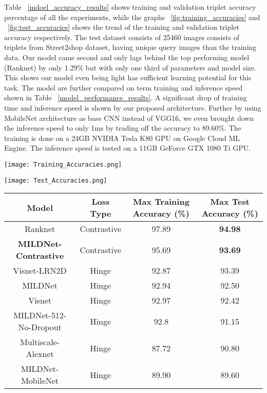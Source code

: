 \documentclass[10pt,twocolumn,letterpaper]{article}
\begin{document}
Table ~\ref{mdoel_accuracy_results} shows training and validation triplet accuracy percentage of all the experiments, while the graphs ~\ref{fig:training_accuracies} and ~\ref{fig:test_accuracies} shows the trend of the training and validation triplet accuracy respectively. The test dataset consists of 25460 images consists of triplets from Street2shop dataset, having unique query images than the training data. Our model came second and only lags behind the top performing model (Ranknet) by only 1.29\% but with only one third of parameters and model size. This shows our model even being light has sufficient learning potential for this task. The model are further compared on term training and inference speed shown in Table ~\ref{model_performance_results}. A significant drop of training time and inference speed is shown by our proposed architecture. Further by using MobileNet architecture as base CNN instead of VGG16, we even brought down the inference speed to only 1ms by trading off the accuracy to 89.60\%. The training is done on a 24GB NVIDIA Tesla K80 GPU on Google Cloud ML Engine. The inference speed is tested on a 11GB GeForce GTX 1080 Ti GPU.

\begin{figure*}
\centering
\begin{minipage}{.5\textwidth}
  \centering
  \texttt{[image: Training\_Accuracies.png]}
  \caption{Trend of training triplet accuracy for different models.}
  \label{fig:training_accuracies}
\end{minipage}\begin{minipage}{.5\textwidth}
  \centering
  \texttt{[image: Test\_Accuracies.png]}
  \caption{Trend of test triplet accuracy for different models.}
  \label{fig:test_accuracies}
\end{minipage}
\end{figure*}

\begin{table*}[h]
\caption{Model Accuracy Results}
\label{mdoel_accuracy_results}
\begin{center}
\begin{tabular}{|c||c|c|c|}
\hline
Model & Loss Type & Max Training Accuracy (\%) & Max Test Accuracy (\%)\\
\hline
\hline
Ranknet & Contrastive & 97.89 & \textbf{94.98}\\
\hline
\textbf{MILDNet-Contrastive} & Contrastive & 95.69 & \textbf{93.69}\\
\hline
Visnet-LRN2D & Hinge & 92.87 & 93.39\\
\hline
MILDNet & Hinge & 92.94 & 92.50\\
\hline
Visnet & Hinge & 92.97 & 92.42\\
\hline
MILDNet-512-No-Dropout & Hinge & 92.8 & 91.15\\
\hline
Multiscale-Alexnet & Hinge & 87.72 & 90.80\\
\hline
MILDNet-MobileNet & Hinge & 89.90 & 89.60\\
\hline
\end{tabular}
\end{center}
\end{table*}
\end{document}
